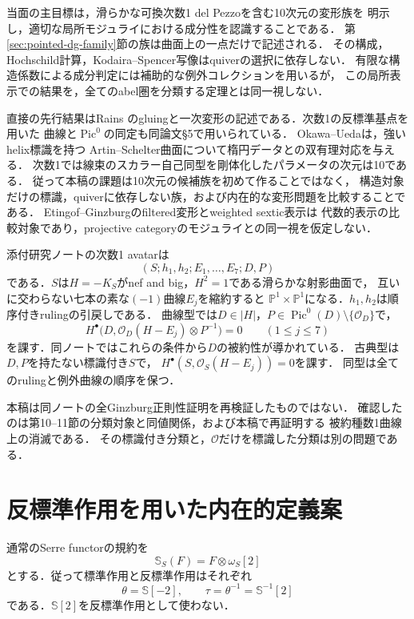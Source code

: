 \documentclass[11pt,a4paper]{ltjsarticle}
\theoremstyle{definition}
\newcommand{\OO}{\mathcal O}
\newcommand{\SSer}{\mathbb S}
\newcommand{\Pic}{\operatorname{Pic}}
\begin{document}
当面の主目標は，滑らかな可換次数1 del Pezzoを含む10次元の変形族を
明示し，適切な局所モジュライにおける成分性を認識することである．
第\ref{sec:pointed-dg-family}節の族は曲面上の一点だけで記述される．
その構成，Hochschild計算，Kodaira--Spencer写像はquiverの選択に依存しない．
有限な構造係数による成分判定には補助的な例外コレクションを用いるが，
この局所表示での結果を，全てのabel圏を分類する定理とは同一視しない．

直接の先行結果はRains\cite[Theorem 4.30と直後のRemarks]{RainsBirational}
のgluingと一次変形の記述である．次数1の反標準基点を用いた
曲線と$\Pic^0$の同定も同論文\S5で用いられている．
Okawa--Ueda\cite[Definition 6.1, Theorem 6.4]{OU}は，強いhelix標識を持つ
Artin--Schelter曲面について楕円データとの双有理対応を与える．
次数1では線束のスカラー自己同型を剛体化したパラメータの次元は10である．
従って本稿の課題は10次元の候補族を初めて作ることではなく，
構造対象だけの標識，quiverに依存しない族，および内在的な変形問題を比較することである．
Etingof--Ginzburg\cite{EG}のfiltered変形とweighted sextic表示は
代数的表示の比較対象であり，projective categoryのモジュライとの同一視を仮定しない．

添付研究ノート\cite{Attached}の次数1 avatarは
\begin{equation}\label{eq:marked-avatar}
 (S;h_1,h_2;E_1,\ldots,E_7;D,P)
\end{equation}
である．$S$は$H=-K_S$がnef and big，$H^2=1$である滑らかな射影曲面で，
互いに交わらない七本の素な$(-1)$曲線$E_j$を縮約すると
$\mathbb P^1\times\mathbb P^1$になる．$h_1,h_2$は順序付きrulingの引戻しである．
曲線型では$D\in|H|$，$P\in\Pic^0(D)\setminus\{\OO_D\}$で，
\begin{equation}\label{eq:root-conditions}
 H^\bullet\bigl(D,\OO_D(H-E_j)\otimes P^{-1}\bigr)=0
 \qquad(1\leq j\leq7)
\end{equation}
を課す．同ノートではこれらの条件から$D$の被約性が導かれている．
古典型は$D,P$を持たない標識付き$S$で，
$H^\bullet(S,\OO_S(H-E_j))=0$を課す．
同型は全てのrulingと例外曲線の順序を保つ．

本稿は同ノートの全Ginzburg正則性証明を再検証したものではない．
確認したのは第10--11節の分類対象と同値関係，および本稿で再証明する
被約種数1曲線上の消滅である．
その標識付き分類と，$\OO$だけを標識した分類は別の問題である．

\section{反標準作用を用いた内在的定義案}
通常のSerre functorの規約を
\begin{equation}\label{eq:serre}
 \SSer_S(F)=F\otimes\omega_S[2]
\end{equation}
とする．従って標準作用と反標準作用はそれぞれ
\begin{equation}\label{eq:tau}
 \theta=\SSer[-2],\qquad
 \tau=\theta^{-1}=\SSer^{-1}[2]
\end{equation}
である．$\SSer[2]$を反標準作用として使わない．
\end{document}
